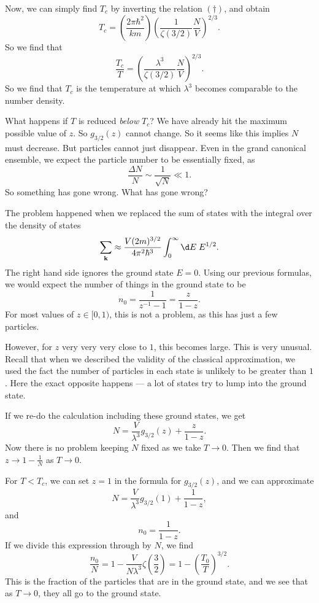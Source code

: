 \documentclass[a4paper]{article}
\begin{document}
Now, we can simply find $T_c$ by inverting the relation $(\dagger)$, and obtain
\[
  T_c = \left(\frac{2\pi \hbar^2}{k m}\right) \left(\frac{1}{\zeta(3/2)} \frac{N}{V}\right)^{2/3}.
\]
So we find that
\[
  \frac{T_c}{T} = \left(\frac{\lambda^3}{\zeta(3/2)} \frac{N}{V}\right)^{2/3}.\tag{$**$}
\]
So we find that $T_c$ is the temperature at which $\lambda^3$ becomes comparable to the number density.

What happens if $T$ is reduced \emph{below} $T_c$? We have already hit the maximum possible value of $z$. So $g_{3/2}(z)$ cannot change. So it seems like this implies $N$ must decrease. But particles cannot just disappear. Even in the grand canonical ensemble, we expect the particle number to be essentially fixed, as
\[
  \frac{\Delta N}{N} \sim \frac{1}{\sqrt{N}} \ll 1.
\]
So something has gone wrong. What has gone wrong?

The problem happened when we replaced the sum of states with the integral over the density of states
\[
  \sum_\mathbf{k} \approx \frac{V(2m)^{3/2}}{4\pi^2 \hbar^3} \int_0^\infty \d E\; E^{1/2}.
\]
The right hand side ignores the ground state $E = 0$. Using our previous formulas, we would expect the number of things in the ground state to be
\[
  n_0 = \frac{1}{z^{-1} - 1} = \frac{z}{1 - z}.
\]
For most values of $z \in [0, 1)$, this is not a problem, as this has just a few particles.

However, for $z$ very very very close to $1$, this becomes large. This is very unusual. Recall that when we described the validity of the classical approximation, we used the fact the number of particles in each state is unlikely to be greater than $1$. Here the exact opposite happens --- a lot of states try to lump into the ground state.

If we re-do the calculation including these ground states, we get
\[
  N = \frac{V}{\lambda^3} g_{3/2}(z) + \frac{z}{1 - z}.
\]
Now there is no problem keeping $N$ fixed as we take $T \to 0$. Then we find that $z \to 1 - \frac{1}{N}$ as $T \to 0$.

For $T < T_c$, we can set $z = 1$ in the formula for $g_{3/2}(z)$, and we can approximate
\[
  N = \frac{V}{\lambda^3} g_{3/2}(1) + \frac{1}{1 - z},
\]
and
\[
  n_0 = \frac{1}{1 - z}.
\]
If we divide this expression through by $N$, we find
\[
  \frac{n_0}{N} = 1 - \frac{V}{N \lambda^3} \zeta\left(\frac{3}{2}\right) = 1 - \left(\frac{T_0}{T}\right)^{3/2}.
\]
This is the fraction of the particles that are in the ground state, and we see that as $T \to 0$, they all go to the ground state.
\end{document}
